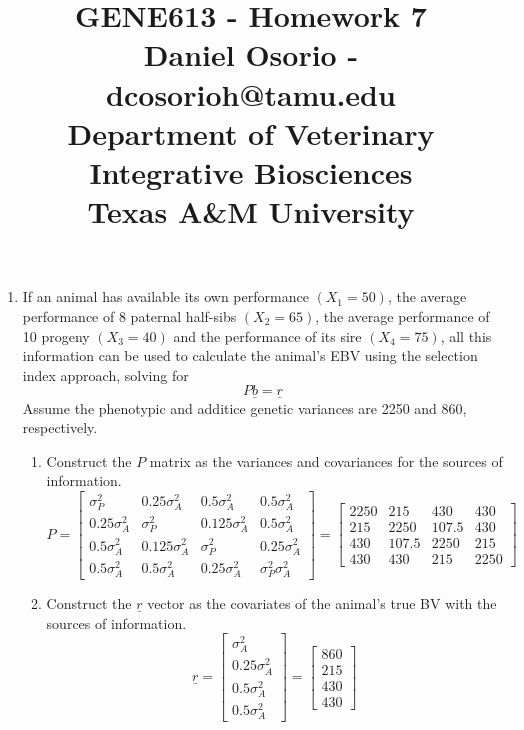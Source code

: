 \documentclass[12pt,a4paper]{paper}
\begin{document}
\title{GENE613 - Homework 7\\\small{Daniel Osorio - dcosorioh@tamu.edu\\Department of Veterinary Integrative Biosciences\\Texas A\&M University}}
\maketitle

\begin{enumerate}
\item If an animal has available its own performance $(X_{1}=50)$, the average performance of 8 paternal half-sibs $(X_{2}=65)$, the average performance of 10 progeny $(X_{3}=40)$ and the performance of its sire $(X_{4}=75)$, all this information can be used to calculate the animal's EBV using the selection index approach, solving for \[P\underline{b}=\underline{r}\] Assume the phenotypic and additice genetic variances are 2250 and 860, respectively.
\begin{enumerate}
\item Construct the $P$ matrix as the variances and covariances for the sources of information.
\begin{equation*}
P = 
\begin{bmatrix}
\sigma^{2}_{P} & 0.25\sigma^{2}_{A} & 0.5\sigma^{2}_{A} & 0.5\sigma^{2}_{A}\\
0.25\sigma^{2}_{A} & \sigma^{2}_{P} & 0.125\sigma^{2}_{A} & 0.5\sigma^{2}_{A} \\
0.5\sigma^{2}_{A} & 0.125\sigma^{2}_{A} & \sigma^{2}_{P} & 0.25\sigma^{2}_{A} \\
0.5\sigma^{2}_{A} & 0.5\sigma^{2}_{A} & 0.25\sigma^{2}_{A} & \sigma^{2}_{P}\sigma^{2}_{A}
\end{bmatrix} = \begin{bmatrix}
2250 & 215 & 430 & 430\\
215 & 2250 & 107.5 & 430\\
430 & 107.5 & 2250 & 215\\
430 & 430 & 215 & 2250
\end{bmatrix}
\end{equation*}
\item Construct the $\underline{r}$ vector as the covariates of the animal's true BV with the sources of information.
\begin{equation*}
\underline{r} = \begin{bmatrix}\sigma^{2}_{A} \\ 0.25\sigma^{2}_{A} \\ 0.5\sigma^{2}_{A} \\ 0.5\sigma^{2}_{A}\end{bmatrix}= \begin{bmatrix}860 \\ 215 \\ 430 \\ 430\end{bmatrix}

\end{equation*}
\end{enumerate}
\end{enumerate}
\end{document}
